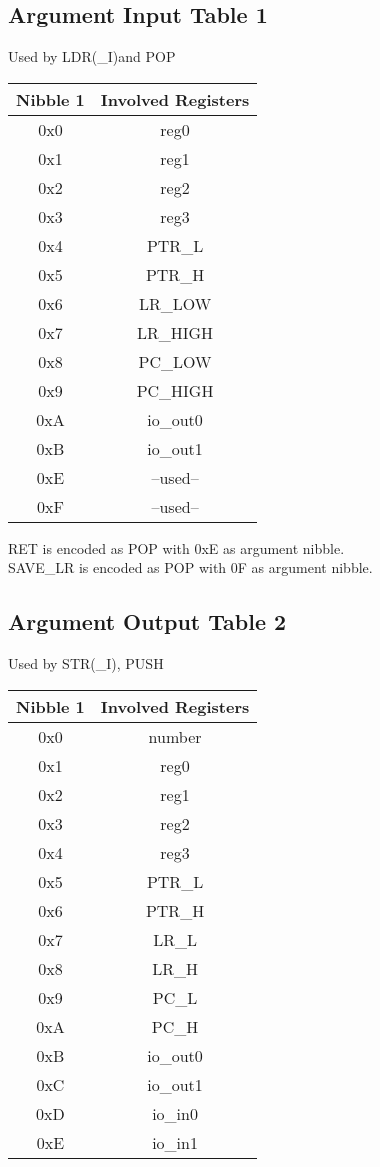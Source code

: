 \documentclass[a4paper, 12pt]{article}
\begin{document}
	\subsection{Argument Input Table 1}
	Used by LDR(\_I)and POP
	\begin{center}
		\begin{tabular}{|c|c|}
			\hline
			Nibble 1 & Involved Registers \\ \hline
			0x0 & reg0 \\ \hline
			0x1 & reg1 \\ \hline
			0x2 & reg2 \\ \hline
			0x3 & reg3 \\ \hline
			0x4 & PTR\_L\\ \hline
			0x5 & PTR\_H \\ \hline
			0x6 & LR\_LOW \\ \hline
			0x7 & LR\_HIGH \\ \hline
			0x8 & PC\_LOW  \\ \hline
			0x9 & PC\_HIGH \\ \hline
			0xA & io\_out0 \\ \hline
			0xB & io\_out1 \\ \hline
			0xE & --used-- \\ \hline
			0xF & --used-- \\ \hline
		\end{tabular}
		RET is encoded as POP with 0xE as argument nibble.\\
		SAVE\_LR is encoded as POP with 0F  as argument nibble.\\
	\end{center}	
	\subsection{Argument Output Table 2}
	Used by STR(\_I), PUSH
	\begin{center}
		\begin{tabular}{|c|c|}
			\hline
			Nibble 1 & Involved Registers \\ \hline
			0x0 & number \\ \hline
			0x1 & reg0 \\ \hline
			0x2 & reg1 \\ \hline
			0x3 & reg2 \\ \hline
			0x4 & reg3 \\ \hline
			0x5 & PTR\_L \\ \hline
			0x6 & PTR\_H \\ \hline
			0x7 & LR\_L \\ \hline
			0x8 & LR\_H \\ \hline
			0x9 & PC\_L \\ \hline
			0xA & PC\_H \\ \hline
			0xB & io\_out0 \\ \hline
			0xC & io\_out1 \\ \hline
			0xD & io\_in0 \\ \hline
			0xE & io\_in1 \\ \hline
		\end{tabular}
	\end{center}
\end{document}
